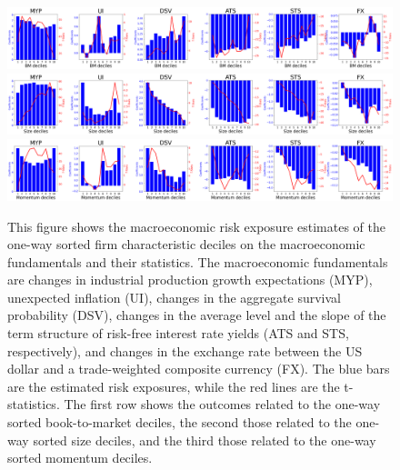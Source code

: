 \documentclass[12pt,a4paper]{ouparticle}
\begin{document}
\begin{figure}
\centering
    \includegraphics[width=16cm]{plots/betahist1.png}\\
    \includegraphics[width=16cm]{plots/betahist2.png}\\
    \includegraphics[width=16cm]{plots/betahist3.png}
  \caption{This figure shows the macroeconomic risk exposure estimates of the one-way sorted firm characteristic deciles on the macroeconomic fundamentals and their statistics. The macroeconomic fundamentals are changes in industrial production growth expectations (MYP), unexpected inflation (UI), changes in the aggregate survival probability (DSV), changes in the average level and the slope of the term structure of risk-free interest rate yields (ATS and STS, respectively), and changes in the exchange rate between the US dollar and a trade-weighted composite currency (FX). The blue bars are the estimated risk exposures, while the red lines are the t-statistics. The first row shows the outcomes related to the one-way sorted book-to-market deciles, the second those related to the one-way sorted size deciles, and the third those related to the one-way sorted momentum deciles.}
\end{figure}

%     
\end{document}
